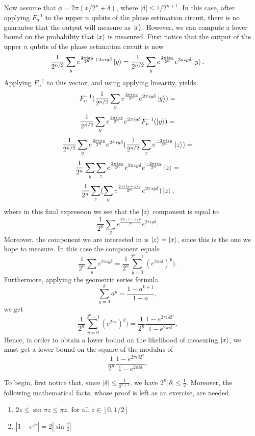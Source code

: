 \documentclass [12pt]{article}
\theoremstyle{definition}
\begin{document}
Now assume that $\phi = 2\pi( x/2^n + \delta)$, where $|\delta| \leq 1/2^{n+1}$. In this case, after applying $F_n^{-1}$ to the upper $n$ qubits of the phase estimation circuit,
there is no guarantee that the output will measure as $\ket{x}$. However, we can compute a lower bound on the probability that $\ket{x}$ is measured. First notice that 
the output of the upper $n$ qubits of the phase estimation circuit is now
\[\frac{1}{2^{n/2}}\sum_{y}e^{\frac{2\pi ixy}{2^n} + 2\pi iy\delta}\ket{y} = \frac{1}{2^{n/2}}\sum_{y}e^{\frac{2\pi ixy}{2^n}}e^{2\pi iy\delta}\ket{y}.\]
Applying $F_n^{-1}$ to this vector, and using applying linearity, yields
\[F_n^{-1}(\frac{1}{2^{n/2}}\sum_{y}e^{\frac{2\pi ixy}{2^n}}e^{2\pi iy\delta}\ket{y}) = \]
\[\frac{1}{2^{n/2}}\sum_{y}e^{\frac{2\pi ixy}{2^n}}e^{2\pi iy\delta}F_n^{-1}(\ket{y}) = \]
\[\frac{1}{2^{n/2}}\sum_{y}e^{\frac{2\pi ixy}{2^n}}e^{2\pi iy\delta}(\frac{1}{2^{n/2}}\sum_ze^{\frac{-2\pi izy}{2^n}}\ket{z}) = \]
\[\frac{1}{2^n}\sum_y\sum_z e^{\frac{2\pi ixy}{2^n}}e^{2\pi iy\delta}e^{\frac{-2\pi izy}{2^n}}\ket{z} = \]
\[\frac{1}{2^n}\sum_z(\sum_y e^{\frac{2\pi i(x-z)y}{2^n}}e^{2\pi iy\delta})\ket{z},\]
where in this final expression we see that the $\ket{z}$ component is equal to 
\[\frac{1}{2^n}\sum_y e^{\frac{2\pi i(x-z)y}{2^n}}e^{2\pi iy\delta}.\]
Moreover, the component we are interested in is $\ket{z} = \ket{x}$, since this is the one we hope to measure. In this case the component equals
\[\frac{1}{2^n}\sum_ye^{2\pi iy\delta} = \frac{1}{2^n}\sum_{y=0}^{2^n - 1} (e^{2\pi i\delta})^y).\]
Furthermore, applying the geometric series formula
\[\sum_{y=0}^k a^y = \frac{1-a^{k+1}}{1-a},\]
we get 
\[\frac{1}{2^n}\sum_{y=0}^{2^n - 1} (e^{2\pi i})^y) = \frac{1}{2^n}\frac{1-e^{2\pi i\delta 2^n}}{1-e^{2\pi i\delta}}.\]
Hence, in order to obtain a lower bound on the likelihood of measuring $\ket{x}$, we must get a lower bound on the square of the modulus of 
\[\frac{1}{2^n}\frac{1-e^{2\pi i\delta 2^n}}{1-e^{2\pi i\delta}}.\]

To begin, first notice that, since $|\delta|\leq \frac{1}{2^{n+1}}$, we have $2^n|\delta| \leq \frac{1}{2}$. Moreover, the following mathematical facts, whose proof is left
as an exercise,  are needed.
\begin{enumerate}

\item  $2z \leq \sin\pi z \leq \pi z$, for all $z\in[0,1/2]$

\item $|1-e^{\phi i}| = 2|\sin\frac{\phi}{2}|$
\end{enumerate}
\end{document}
